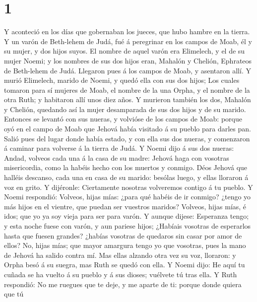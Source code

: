 \hypertarget{section}{%
\section{1}\label{section}}

 Y aconteció en los días que gobernaban los jueces, que
hubo hambre en la tierra. Y un varón de Beth-lehem de Judá, fué á
peregrinar en los campos de Moab, él y su mujer, y dos hijos suyos.
 El nombre de aquel varón era Elimelech, y el de su mujer
Noemi; y los nombres de sus dos hijos eran, Mahalón y Chelión, Ephrateos
de Beth-lehem de Judá. Llegaron pues á los campos de Moab, y asentaron
allí.  Y murió Elimelech, marido de Noemi, y quedó ella
con sus dos hijos;  Los cuales tomaron para sí mujeres de
Moab, el nombre de la una Orpha, y el nombre de la otra Ruth; y
habitaron allí unos diez años.  Y murieron también los
dos, Mahalón y Chelión, quedando así la mujer desamparada de sus dos
hijos y de su marido.  Entonces se levantó con sus nueras,
y volvióse de los campos de Moab: porque oyó en el campo de Moab que
Jehová había visitado á su pueblo para darles pan.  Salió
pues del lugar donde había estado, y con ella sus dos nueras, y
comenzaron á caminar para volverse á la tierra de Judá.  Y
Noemi dijo á sus dos nueras: Andad, volveos cada una á la casa de su
madre: Jehová haga con vosotras misericordia, como la habéis hecho con
los muertos y conmigo.  Déos Jehová que halléis descanso,
cada una en casa de su marido: besólas luego, y ellas lloraron á voz en
grito.  Y dijéronle: Ciertamente nosotras volveremos
contigo á tu pueblo.  Y Noemi respondió: Volveos, hijas
mías: ¿para qué habéis de ir conmigo? ¿tengo yo más hijos en el vientre,
que puedan ser vuestros maridos?  Volveos, hijas mías, é
idos; que yo ya soy vieja para ser para varón. Y aunque dijese:
Esperanza tengo; y esta noche fuese con varón, y aun pariese hijos;
 ¿Habíais vosotras de esperarlos hasta que fuesen
grandes? ¿habías vosotras de quedaros sin casar por amor de ellos? No,
hijas mías; que mayor amargura tengo yo que vosotras, pues la mano de
Jehová ha salido contra mí.  Mas ellas alzando otra vez
su voz, lloraron: y Orpha besó á su suegra, mas Ruth se quedó con ella.
 Y Noemi dijo: He aquí tu cuñada se ha vuelto á su pueblo
y á sus dioses; vuélvete tú tras ella.  Y Ruth respondió:
No me ruegues que te deje, y me aparte de ti: porque donde quiera que tú
